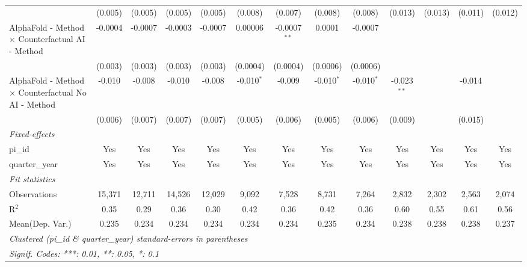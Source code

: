 \begin{tabular}{lcccccccccccc}
                                                              & (0.005)      & (0.005)     & (0.005)      & (0.005)      & (0.008)      & (0.007)        & (0.008)      & (0.008)      & (0.013)       & (0.013) & (0.011)  & (0.012)\\   
   AlphaFold - Method $\times$ Counterfactual AI - Method     & -0.0004      & -0.0007     & -0.0003      & -0.0007      & 0.00006      & -0.0007$^{**}$ & 0.0001       & -0.0007      &               &         &          &   \\   
                                                              & (0.003)      & (0.003)     & (0.003)      & (0.003)      & (0.0004)     & (0.0004)       & (0.0006)     & (0.0006)     &               &         &          &   \\   
   AlphaFold - Method $\times$ Counterfactual No AI - Method  & -0.010       & -0.008      & -0.010       & -0.008       & -0.010$^{*}$ & -0.009         & -0.010$^{*}$ & -0.010$^{*}$ & -0.023$^{**}$ &         & -0.014   &   \\   
                                                              & (0.006)      & (0.007)     & (0.007)      & (0.007)      & (0.005)      & (0.006)        & (0.005)      & (0.006)      & (0.009)       &         & (0.015)  &   \\   
   \midrule
   \emph{Fixed-effects}\\
   pi\_id                                                     & Yes          & Yes         & Yes          & Yes          & Yes          & Yes            & Yes          & Yes          & Yes           & Yes     & Yes      & Yes\\  
   quarter\_year                                              & Yes          & Yes         & Yes          & Yes          & Yes          & Yes            & Yes          & Yes          & Yes           & Yes     & Yes      & Yes\\  
   \midrule
   \emph{Fit statistics}\\
   Observations                                               & 15,371       & 12,711      & 14,526       & 12,029       & 9,092        & 7,528          & 8,731        & 7,264        & 2,832         & 2,302   & 2,563    & 2,074\\  
   R$^2$                                                      & 0.35         & 0.29        & 0.36         & 0.30         & 0.42         & 0.36           & 0.42         & 0.36         & 0.60          & 0.55    & 0.61     & 0.56\\  
Mean(Dep. Var.) & 0.235 & 0.234 & 0.234 & 0.234 & 0.234 & 0.234 & 0.235 & 0.234 & 0.238 & 0.238 & 0.238 & 0.237 \\
   \midrule \midrule
   \multicolumn{13}{l}{\emph{Clustered (pi\_id \& quarter\_year) standard-errors in parentheses}}\\
   \multicolumn{13}{l}{\emph{Signif. Codes: ***: 0.01, **: 0.05, *: 0.1}}\\
\end{tabular}
\par\endgroup
